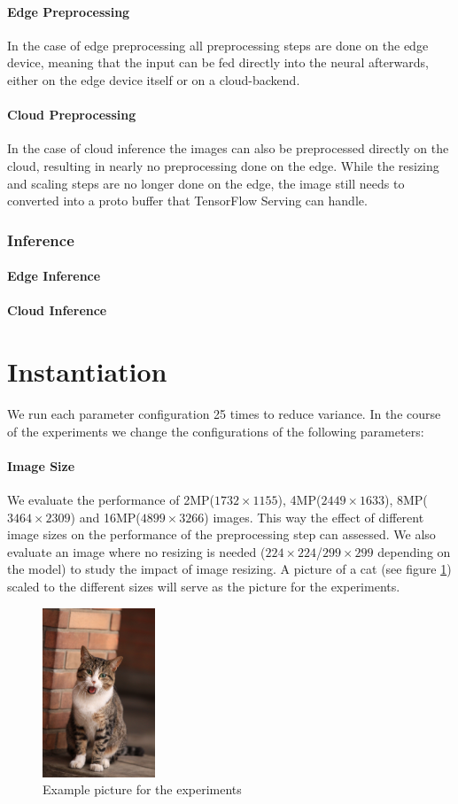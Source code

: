 \paragraph{Edge Preprocessing}
In the case of edge preprocessing all preprocessing steps are done on the edge device, meaning that the input can be fed directly into the neural afterwards, either on the edge device itself or on a cloud-backend.
\paragraph{Cloud Preprocessing}
In the case of cloud inference the images can also be preprocessed directly on the cloud, resulting in nearly no preprocessing done on the edge. While the resizing and scaling steps are no longer done on the edge, the image still needs to converted into a proto buffer that TensorFlow Serving can handle.
\subsubsection{Inference}
\paragraph{Edge Inference}
\paragraph{Cloud Inference}
\section{Instantiation}
We run each parameter configuration 25 times to reduce variance.
In the course of the experiments we change the configurations of the following parameters:
\paragraph{Image Size}
We evaluate the performance of 2MP($1732\times1155$), 4MP($2449\times1633$), 8MP($3464\times2309$) and 16MP($4899\times3266$) images. This way the effect of different image sizes on the performance of the preprocessing step can assessed. We also evaluate an image where no resizing is needed ($224\times224$/$299\times299$ depending on the model) to study the impact of image resizing. A picture of a cat (see figure \ref{fig:cat}) scaled to the different sizes will serve as the picture for the experiments.
\begin{figure}[H]
\centering
\includegraphics[width=0.3\textwidth]{./Bilder/European_cat_02_16_mp.jpg}
\caption{Example picture for the experiments \cite{cat}}
\label{fig:cat}
\end{figure}
